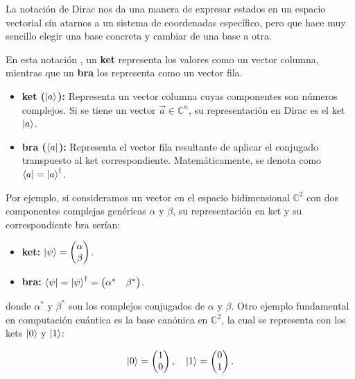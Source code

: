 La notación de Dirac nos da una manera de expresar estados en un espacio vectorial sin atarnos a un sistema de coordenadas específico, pero que hace muy sencillo elegir una base concreta y cambiar de una base a otra.

En esta notación \cite{pierce_braket_2025}, un \textbf{ket} representa los valores como un vector columna, mientras que un \textbf{bra} los representa como un vector fila.

\begin{itemize}
    \item \textbf{ket ($\ket{a}$):} Representa un vector columna cuyas componentes son números complejos. Si se tiene un vector $\vec{a} \in \mathbb{C}^n$, su representación en Dirac es el ket $\ket{a}$.
    \item \textbf{bra ($\bra{a}$):} Representa el vector fila resultante de aplicar el conjugado transpuesto al ket correspondiente. Matemáticamente, se denota como $\bra{a} = \ket{a}^{\dagger}$.
\end{itemize}

Por ejemplo, si consideramos un vector en el espacio bidimensional $\mathbb{C}^2$ con dos componentes complejas genéricas $\alpha$ y $\beta$, su representación en ket y su correspondiente bra serían:

\begin{itemize}
    \item \textbf{ket:} $\ket{\psi} = \begin{pmatrix} \alpha \\ \beta \end{pmatrix}$.
    \item \textbf{bra:} $\bra{\psi} = \ket{\psi}^{\dagger} = \begin{pmatrix} \alpha^* & \beta^* \end{pmatrix}$.
\end{itemize}

donde $\alpha^*$ y $\beta^*$ son los complejos conjugados de $\alpha$ y $\beta$. Otro ejemplo fundamental en computación cuántica es la base canónica en $\mathbb{C}^2$, la cual se representa con los kets $\ket{0}$ y $\ket{1}$:

\[
    \ket{0} = \begin{pmatrix} 1 \\ 0 \end{pmatrix}, \quad \ket{1} = \begin{pmatrix} 0 \\ 1 \end{pmatrix}.
\]

